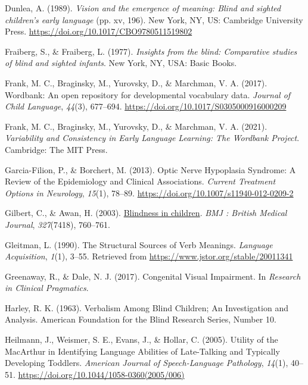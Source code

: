 \documentclass[
  man,floatsintext]{apa6}
\newlength{\cslhangindent}
\newlength{\cslentryspacingunit} %
\newenvironment{CSLReferences}[2] %
 {%
  \setlength{\parindent}{0pt}
  \ifodd #1
  \let\oldpar\par
  \def\par{\hangindent=\cslhangindent\oldpar}
  \fi
  \setlength{\parskip}{#2\cslentryspacingunit}
 }%
 {}
\begin{document}
\begin{CSLReferences}{1}{0}
\leavevmode{}%
Dunlea, A. (1989). \emph{Vision and the emergence of meaning: {Blind} and sighted children's early language} (pp. xv, 196). {New York, NY, US}: {Cambridge University Press}. \url{https://doi.org/10.1017/CBO9780511519802}

\leavevmode{}%
Fraiberg, S., \& Fraiberg, L. (1977). \emph{Insights from the blind: {Comparative} studies of blind and sighted infants}. {New York, NY, USA}: {Basic Books}.

\leavevmode{}%
Frank, M. C., Braginsky, M., Yurovsky, D., \& Marchman, V. A. (2017). Wordbank: An open repository for developmental vocabulary data. \emph{Journal of Child Language}, \emph{44}(3), 677--694. \url{https://doi.org/10.1017/S0305000916000209}

\leavevmode{}%
Frank, M. C., Braginsky, M., Yurovsky, D., \& Marchman, V. A. (2021). \emph{Variability and {Consistency} in {Early Language Learning}: {The Wordbank Project}}. {Cambridge}: {The MIT Press}.

\leavevmode{}%
Garcia-Filion, P., \& Borchert, M. (2013). Optic {Nerve Hypoplasia Syndrome}: {A Review} of the {Epidemiology} and {Clinical Associations}. \emph{Current Treatment Options in Neurology}, \emph{15}(1), 78--89. \url{https://doi.org/10.1007/s11940-012-0209-2}

\leavevmode{}%
Gilbert, C., \& Awan, H. (2003). \href{https://www.ncbi.nlm.nih.gov/pmc/articles/PMC214052}{Blindness in children}. \emph{BMJ : British Medical Journal}, \emph{327}(7418), 760--761.

\leavevmode{}%
Gleitman, L. (1990). The {Structural Sources} of {Verb Meanings}. \emph{Language Acquisition}, \emph{1}(1), 3--55. Retrieved from \url{https://www.jstor.org/stable/20011341}

\leavevmode{}%
Greenaway, R., \& Dale, N. J. (2017). Congenital {Visual Impairment}. In \emph{Research in {Clinical Pragmatics}}.

\leavevmode{}%
Harley, R. K. (1963). Verbalism {Among Blind Children}; {An Investigation} and {Analysis}. {American Foundation} for the {Blind Research Series}, {Number} 10.

\leavevmode{}%
Heilmann, J., Weismer, S. E., Evans, J., \& Hollar, C. (2005). Utility of the {MacArthur} in {Identifying Language Abilities} of {Late-Talking} and {Typically Developing Toddlers}. \emph{American Journal of Speech-Language Pathology}, \emph{14}(1), 40--51. \url{https://doi.org/10.1044/1058-0360(2005/006)}


\end{CSLReferences}
\end{document}
